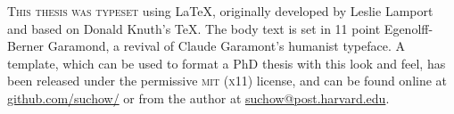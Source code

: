 \newpage

\vspace*{200pt}

\begin{center}
\parbox{200pt}{\raggedright\lettrine[lines=3,slope=-2pt,nindent=-4pt]{\textcolor{SchoolColor}{T}}{his thesis was typeset} using \LaTeX, originally developed by Leslie Lamport and based on Donald Knuth's \TeX. The body text is set in 11 point Egenolff-Berner Garamond, a revival of Claude Garamont's humanist typeface. A template, which can be used to format a PhD thesis with this look and feel, has been released under the permissive \textsc{mit} (\textsc{x}11) license, and can be found online at \href{https://github.com/suchow/}{github.com/suchow/} or from the author at \href{mailto:suchow@fas.harvard.edu}{suchow@post.harvard.edu}.
}
\end{center}
